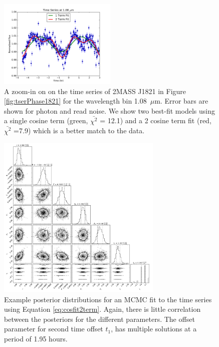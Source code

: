 \documentclass[twocolumn]{aastex6}
\begin{document}
\begin{figure}
\begin{centering}
\includegraphics[width=0.5\textwidth]{best_fit_2term.pdf}
\caption{A zoom-in on on the time series of 2MASS J1821 in Figure \ref{fig:tserPhase1821} for the wavelength bin 1.08~$\mu$m. Error bars are shown for photon and read noise. We show two best-fit models using a single cosine term (green, $\bar{\chi^2}$ = 12.1) and a 2 cosine term fit (red, $\bar{\chi^2}$ =7.9) which is a better match to the data.}\label{fig:model2Cosfit}
\end{centering}
\end{figure}


\begin{figure}
\begin{centering}
\includegraphics[width=0.7\textwidth]{corner_fit_2term.pdf}
\caption{Example posterior distributions for an MCMC fit to the time series using Equation \ref{eq:cosfit2term}.
Again, there is little correlation between the posteriors for the different parameters.
The offset parameter for second time offset $t_1$, has multiple solutions at a period of 1.95 hours.}\label{fig:post2Cosfit}
\end{centering}
\end{figure}
\end{document}
